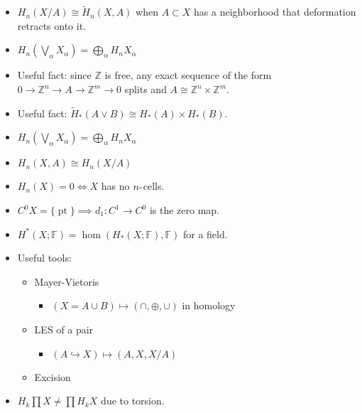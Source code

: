 \begin{itemize}
\item
  \(H_n(X/A) \cong \tilde H_n(X, A)\) when \(A\subset X\) has a
  neighborhood that deformation retracts onto it.
\item
  \(H_n(\bigvee_\alpha X_\alpha) = \bigoplus_\alpha H_n X_\alpha\)
\item
  Useful fact: since \({\mathbb{Z}}\) is free, any exact sequence of the
  form \(0 \to {\mathbb{Z}}^n \to A \to {\mathbb{Z}}^m \to 0\) splits
  and \(A\cong {\mathbb{Z}}^{n}\times{\mathbb{Z}}^m\).
\item
  Useful fact: \(\tilde H_*(A\vee B) \cong H_*(A) \times H_*(B)\).
\item
  \(H_n(\bigvee_\alpha X_\alpha) = \bigoplus_\alpha H_n X_\alpha\)
\item
  \(H_n(X, A) \cong H_n(X/A)\)
\item
  \(H_n(X) = 0 \iff X\) has no \(n{\hbox{-}}\)cells.
\item
  \(C^0 X = {\{\operatorname{pt}\}}\implies d_1: C^1 \to C^0\) is the
  zero map.
\item
  \(H^*(X; {\mathbb{F}}) = \hom(H_*(X; {\mathbb{F}}),{\mathbb{F}})\) for
  a field.
\item
  Useful tools:

  \begin{itemize}
  \tightlist
  \item
    Mayer-Vietoris

    \begin{itemize}
    \tightlist
    \item
      \((X = A \cup B) \mapsto (\cap, \oplus, \cup)\) in homology
    \end{itemize}
  \item
    LES of a pair

    \begin{itemize}
    \tightlist
    \item
      \((A \hookrightarrow X) \mapsto (A, X, X/A)\)
    \end{itemize}
  \item
    Excision
  \end{itemize}
\item
  \(H_k \prod X \neq \prod H_k X\) due to torsion.


\end{itemize}
